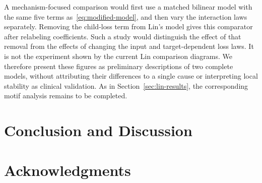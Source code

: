 \documentclass{article}
\begin{document}
A mechanism-focused comparison would first use a matched bilinear model
with the same five terms as~\eqref{eq:modified-model}, and then vary the
interaction laws separately. Removing the child-loss term from Lin's
model gives this comparator after relabeling coefficients. Such a study
would distinguish the effect of that removal from the effects of changing
the input and target-dependent loss laws. It is not the experiment shown
by the current Lin comparison diagrams. We therefore present these
figures as preliminary descriptions of two complete models, without
attributing their differences to a single cause or interpreting local
stability as clinical validation. As in Section~\ref{sec:lin-results},
the corresponding motif analysis remains to be completed.


\section{Conclusion and Discussion}

\section{Acknowledgments}

\end{document}
